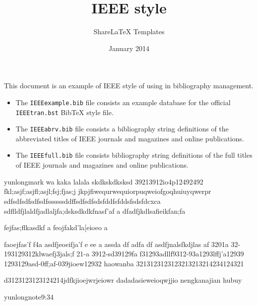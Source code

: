 \documentclass{article}
\title{IEEE \BibTeX{Deep Convolutional Neurol Networks} style}
\author{ShareLaTeX Templates}
\date{January 2014}
\begin{document}
\maketitle

This document is an example of IEEE style of \BibTeX{} using in bibliography management. 
\begin{itemize}
\item The \texttt{IEEEexample.bib} file consists an example \BibTeX{} database for the official \texttt{IEEEtran.bst} BibTeX style file.
\item The \texttt{IEEEabrv.bib} file consists a \BibTeX{} bibliography string definitions of the abbreviated titles of IEEE journals and magazines and online publications.
\item The \texttt{IEEEfull.bib} file consists \BibTeX{} bibliography string definitions of the full titles of IEEE journals and magazines and online publications.
\end{itemize}


yunlongmark   wa kaka  
 lalala 
skdkskdksksd
39213912io4p12492492
fkl;asjf;asjfl;asjl;fsj;fjas;j
jkpjfiwequrwequiorpuqweiofgoqhuiuyqwerpr
sdfsdfsdfsdfsdfssssssddffsdfsdfsdsfddfsfddsfsdsfdcxca
sdflldfjlaldfjadlaljfa;dsksdkdkfnasf'af
a
dfadfjkdlsafieikfan;fa

fejfas;flkasdkf
a
feojfakd'la[eioeo
a

faoejfas'f
f4a
asdfjeoeifja'f
e
ee
a
assda
df
adfa
df
asdfjnalsfkdjlas
af
3201a
32-193129312klwaefj3jals;f
21-a
3912-sd39129fa
f31293adllf9312-93a1293lffj'a12939
1293129asd-0ff;af-039jioew12932
haowanba 
3213123123123213213214234124321

d3123123123124214jdfkjioejwrjeiowr
dadadasieweioqwjjio  nengkanajian   
hubuy

yunlongnote{9:34}
\nocite{*}


\end{document}
